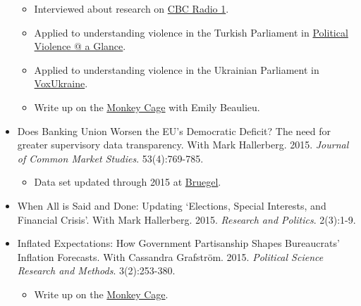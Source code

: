 \documentclass[a4paper]{article}
\begin{document}
\begin{itemize}
        \begin{itemize}
            \item Interviewed about research on \href{http://www.cbc.ca/radio/day6/episode-286-parliamentary-brawls-transgender-rights-the-raptors-secret-weapon-migrant-ships-and-more-1.3591232/you-thought-elbowgate-was-bad-check-out-these-political-brawls-1.3591248}{CBC Radio 1}.

            \item Applied to understanding violence in the Turkish Parliament in \href{https://politicalviolenceataglance.org/2016/05/27/brawl-in-turkish-national-assembly-indicates-deeper-trouble/}{Political Violence @ a Glance}.

            \item Applied to understanding violence in the Ukrainian Parliament in \href{http://voxukraine.org/2015/12/24/causes-and-possible-solutions-to-brawling-in-the-ukrainian-parliament-en-2/}{VoxUkraine}.

            \item Write up on the \href{http://t.co/fETbFCXcYU}{Monkey Cage} with Emily Beaulieu.

        \end{itemize}

    \item Does Banking Union Worsen the EU's Democratic Deficit? The need for greater supervisory data transparency. With Mark Hallerberg. 2015. {\emph{Journal of Common Market Studies}}. 53(4):769-785.

        \begin{itemize}
            \item Data set updated through 2015 at \href{http://bruegel.org/2016/05/the-european-union-remains-a-laggard-on-banking-supervisory-transparency/}{Bruegel}.
        \end{itemize}

    \item When All is Said and Done: Updating `Elections, Special Interests, and Financial Crisis'. With Mark Hallerberg. 2015. \emph{Research and Politics}. 2(3):1-9.

    \item Inflated Expectations: How Government Partisanship Shapes Bureaucrats' Inflation Forecasts. With Cassandra Grafstr\"{o}m. 2015. {\emph{Political Science Research and Methods}}. 3(2):253-380.

    \begin{itemize}
        \item Write up on the \href{http://www.washingtonpost.com/blogs/monkey-cage/wp/2015/01/28/the-fed-cant-accurately-forecast-inflation-heres-why-this-may-hurt-democrats/}{Monkey Cage}.
    \end{itemize}


\end{itemize}
\end{document}
